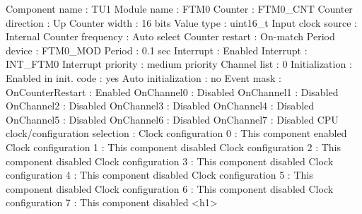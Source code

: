 \begin{DoxyCode}
            Component name                                 : TU1
            Module name                                    : FTM0
            Counter                                        : FTM0\_CNT
            Counter direction                              : Up
            Counter width                                  : 16 bits
            Value type                                     : uint16\_t
            Input clock source                             : Internal
              Counter frequency                            : Auto select
            Counter restart                                : On-match
              Period device                                : FTM0\_MOD
              Period                                       : 0.1 sec
              Interrupt                                    : Enabled
                Interrupt                                  : INT\_FTM0
                Interrupt priority                         : medium priority
            Channel list                                   : 0
            Initialization                                 : 
              Enabled in init. code                        : yes
              Auto initialization                          : no
              Event mask                                   : 
                OnCounterRestart                           : Enabled
                OnChannel0                                 : Disabled
                OnChannel1                                 : Disabled
                OnChannel2                                 : Disabled
                OnChannel3                                 : Disabled
                OnChannel4                                 : Disabled
                OnChannel5                                 : Disabled
                OnChannel6                                 : Disabled
                OnChannel7                                 : Disabled
            CPU clock/configuration selection              : 
              Clock configuration 0                        : This component enabled
              Clock configuration 1                        : This component disabled
              Clock configuration 2                        : This component disabled
              Clock configuration 3                        : This component disabled
              Clock configuration 4                        : This component disabled
              Clock configuration 5                        : This component disabled
              Clock configuration 6                        : This component disabled
              Clock configuration 7                        : This component disabled
<h1>
\end{DoxyCode}
